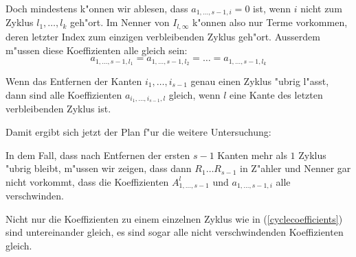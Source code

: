 Doch mindestens k"onnen wir ablesen, dass $a_{1,\dots,s-1,i}=0$ ist,
wenn $i$ nicht zum Zyklus $l_1,\dots,l_k$ geh"ort. Im Nenner von
$I_{l,\infty}$ k"onnen also nur Terme vorkommen, deren letzter Index
zum einzigen verbleibenden Zyklus geh"ort.
Ausserdem m"ussen diese Koeffizienten alle gleich sein:
\begin{equation}
a_{1,\dots,s-1,l_1}=a_{1,\dots,s-1,l_2}=\dots= a_{1,\dots,s-1,l_k}
\label{cyclecoefficients}
\end{equation}
\begin{hilfssatz}
\label{gleichekoef-n-1}
Wenn das Entfernen der Kanten $i_1,\dots,i_{s-1}$ genau einen
Zyklus "ubrig l"asst, dann sind alle Koeffizienten
$a_{i_1,\dots,i_{s-1},l}$ gleich, wenn $l$ eine Kante des letzten
verbleibenden Zyklus ist.
\end{hilfssatz}
Damit ergibt sich jetzt der Plan f"ur die weitere Untersuchung:
\begin{compactenum}
\item In dem Fall, dass nach Entfernen der ersten $s-1$ Kanten mehr als $1$
Zyklus "ubrig bleibt, m"ussen wir zeigen, dass dann $R_1\dots R_{s-1}$
in Z"ahler und Nenner gar nicht vorkommt, dass die Koeffizienten
$A_{1,\dots,s-1}^l$ und $a_{1,\dots,s-1,i}$ alle verschwinden.
\item Nicht nur die Koeffizienten zu einem einzelnen Zyklus
wie in (\ref{cyclecoefficients}) sind untereinander gleich, es sind
sogar alle nicht verschwindenden Koeffizienten gleich.
\end{compactenum}

